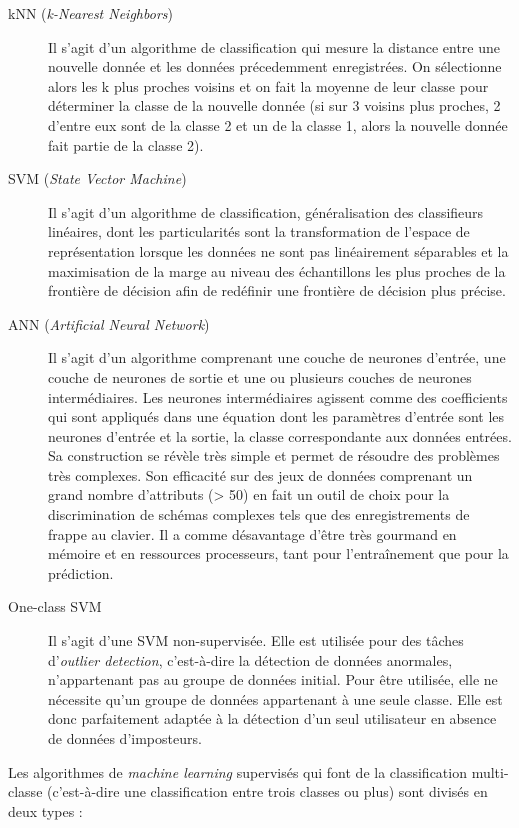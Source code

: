 \begin{description}
  \item[kNN\cite{Hu2008} (\textit{k-Nearest Neighbors})] Il s'agit d'un algorithme de classification qui mesure la distance entre une nouvelle donnée et les données précedemment enregistrées. On sélectionne alors les k plus proches voisins et on fait la moyenne de leur classe pour déterminer la classe de la nouvelle donnée (si sur 3 voisins plus proches, 2 d'entre eux sont de la classe 2 et un de la classe 1, alors la nouvelle donnée fait partie de la classe 2).
  \item[SVM\cite{giotSVM} (\textit{State Vector Machine})] Il s'agit d'un algorithme de classification, généralisation des classifieurs linéaires, dont les particularités sont la transformation de l'espace de représentation lorsque les données ne sont pas linéairement séparables et la maximisation de la marge au niveau des échantillons les plus proches de la frontière de décision afin de redéfinir une frontière de décision plus précise.
  \item[ANN (\textit{Artificial Neural Network})] Il s'agit d'un algorithme comprenant une couche de neurones d'entrée, une couche de neurones de sortie et une ou plusieurs couches de neurones intermédiaires. Les neurones intermédiaires agissent comme des coefficients qui sont appliqués dans une équation dont les paramètres d'entrée sont les neurones d'entrée et la sortie, la classe correspondante aux données entrées. Sa construction se révèle très simple et permet de résoudre des problèmes très complexes. Son efficacité sur des jeux de données comprenant un grand nombre d'attributs (> 50) en fait un outil de choix pour la discrimination de schémas complexes tels que des enregistrements de frappe au clavier. Il a comme désavantage d'être très gourmand en mémoire et en ressources processeurs, tant pour l'entraînement que pour la prédiction.
  \item[One-class SVM\cite{oneclassSVM}] Il s'agit d'une SVM non-supervisée. Elle est utilisée pour des tâches d'\textit{outlier detection}, c'est-à-dire la détection de données anormales, n'appartenant pas au groupe de données initial. Pour être utilisée, elle ne nécessite qu'un groupe de données appartenant à une seule classe. Elle est donc parfaitement adaptée à la détection d'un seul utilisateur en absence de données d'imposteurs.
\end{description}

Les algorithmes de \textit{machine learning} supervisés qui font de la classification multi-classe (c'est-à-dire une classification entre trois classes ou plus) sont divisés en deux types :\\

